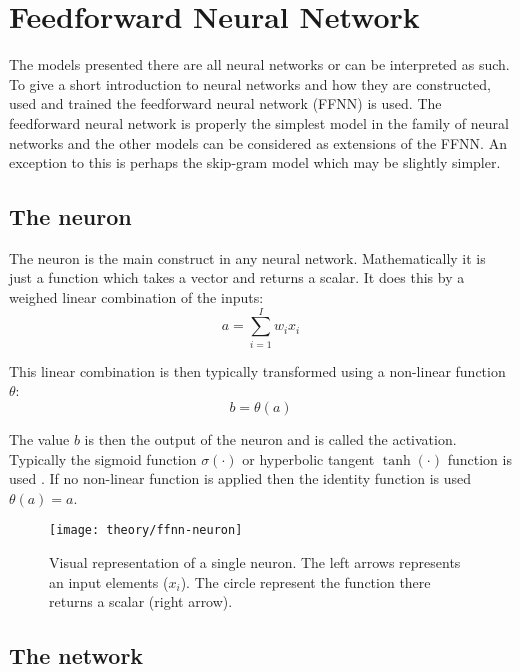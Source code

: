 
\section{Feedforward Neural Network}

The models presented there are all neural networks or can be interpreted as such. To give a short introduction to neural networks and how they are constructed, used and trained the feedforward neural network (FFNN) is used. The feedforward neural network is properly the simplest model in the family of neural networks and the other models can be considered as extensions of the FFNN. An exception to this is perhaps the skip-gram model which may be slightly simpler.

\subsection{The neuron}

The neuron is the main construct in any neural network. Mathematically it is just a function which takes a vector and returns a scalar. It does this by a weighed linear combination of the inputs:
\begin{equation}
a = \sum_{i=1}^I w_{i} x_i
\end{equation}

This linear combination is then typically transformed using a non-linear function $\theta$:
\begin{equation}
b = \theta(a)
\end{equation}

The value $b$ is then the output of the neuron and is called the activation. Typically the sigmoid function $\sigma(\cdot)$ or hyperbolic tangent $\tanh(\cdot)$ function is used \cite{bishop}. If no non-linear function is applied then the identity function is used $\theta(a) = a$.

\begin{figure}[H]
	\centering
	\texttt{[image: theory/ffnn-neuron]}
	\caption{Visual representation of a single neuron. The left arrows represents an input elements ($x_i$). The circle represent the function there returns a scalar (right arrow).}
\end{figure}

\subsection{The network}

